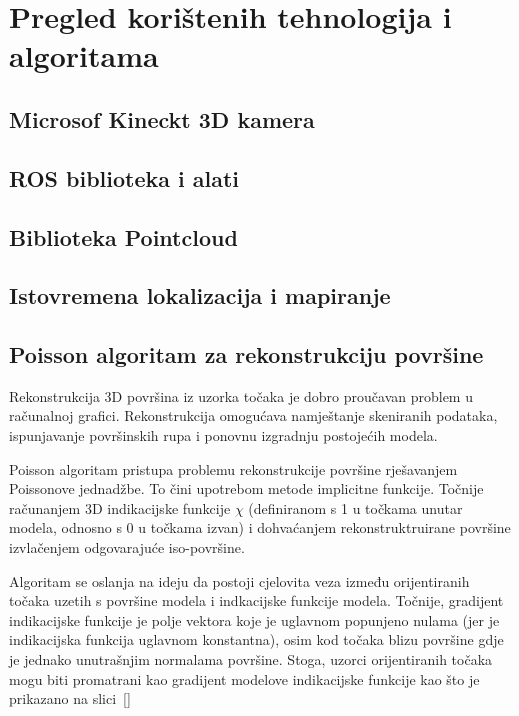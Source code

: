 \newpage
\setcounter{figure}{0}

\section{Pregled korištenih tehnologija i algoritama} %
\label{sec:Tehnologija i teorija}


\subsection{Microsof Kineckt 3D kamera} %
\label{sub:Microsof Kineckt 3D kamera}


\subsection{ROS biblioteka i alati} %
\label{sub:ROS biblioteka i alati}


\subsection{Biblioteka Pointcloud} %
\label{sub:Biblioteka Pointcloud}



\subsection{Istovremena lokalizacija i mapiranje} %
\label{sub:Slam}


\newpage
\subsection{Poisson algoritam za rekonstrukciju površine} %
\label{sub:Poisson}
Rekonstrukcija 3D površina iz uzorka točaka je dobro proučavan problem u
računalnoj grafici. Rekonstrukcija omogućava namještanje skeniranih
podataka, ispunjavanje površinskih rupa i ponovnu izgradnju postojećih
modela.

Poisson algoritam pristupa problemu rekonstrukcije površine rješavanjem
Poissonove jednadžbe. To čini upotrebom metode implicitne funkcije.
Točnije računanjem 3D indikacijske funkcije \(\chi\) (definiranom s 1 u
točkama unutar modela, odnosno s 0 u točkama izvan) i dohvaćanjem
rekonstruktruirane površine izvlačenjem odgovarajuće iso-površine.

Algoritam se oslanja na ideju da postoji cjelovita veza između
orijentiranih točaka uzetih s površine modela i indkacijske funkcije
modela. Točnije, gradijent indikacijske funkcije je polje vektora koje
je uglavnom popunjeno nulama (jer je indikacijska funkcija uglavnom
konstantna), osim kod točaka blizu površine gdje je jednako unutrašnjim
normalama površine. Stoga, uzorci orijentiranih točaka mogu biti
promatrani kao gradijent modelove indikacijske funkcije kao što je
prikazano na slici~\ref{}



